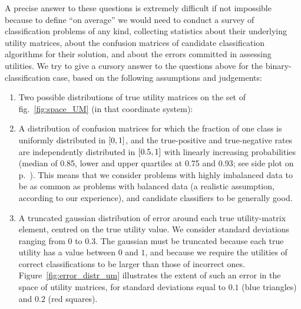 \documentclass[\ifafour a4paper,12pt,\else a5paper,10pt,\fi%
onecolumn,oneside,article,%
british%
]{memoir}
\theoremstyle{remark}
\theoremstyle{innote}
\DeclarePairedDelimiter\clcl{[}{]}
\renewcommand*{\|}[1][]{\nonscript\:#1\vert\nonscript\:\mathopen{}}
\newcommand*{\eqn}{eq.}%
\newcommand*{\fig}{fig.}%
\newcommand*{\sumatrix}[4]{\begin{bsmallmatrix*}[r]#1&#2\\#3&#4\end{bsmallmatrix*}}
\begin{document}
A precise answer to these questions is extremely difficult if not impossible because to define \enquote{on average} we would need to conduct a survey of classification problems of any kind, collecting statistics about their underlying utility matrices, about the confusion matrices of candidate classification algorithms for their solution, and about the errors committed in assessing utilities. We try to give a cursory answer to the questions above for the binary-classification case, based on the following assumptions and judgements:
\begin{enumerate}[label=(\roman*)]
\item\label{item:distr_um} Two possible distributions of true utility matrices on the set of \fig~\ref{fig:space_UM} (in that coordinate system):   

\item\label{item:distr_cm} A distribution of confusion matrices for which the fraction of one class is uniformly distributed in $\clcl{0,1}$, and the true-positive and true-negative rates are independently distributed in $\clcl{0.5, 1}$ with linearly increasing probabilities (median of 0.85, lower and upper quartiles at 0.75 and 0.93; see side plot on p.~\pageref{fig:linear_distr}). This means that we consider problems with highly imbalanced data to be as common as problems with balanced data (a realistic assumption, according to our experience), and candidate classifiers to be generally good.
  
\item\label{item:distr_error} A truncated gaussian distribution of error around each true utility-matrix element, centred on the true utility value. We consider standard deviations ranging from $0$ to $0.3$. The gaussian must be truncated because each true utility has a value between $0$ and $1$, and because we require the utilities of correct classifications to be larger than those of incorrect ones. Figure~\ref{fig:error_distr_um} illustrates the extent of such an error in the space of utility matrices, for standard deviations equal to $0.1$ (blue triangles) and $0.2$ (red squares).
\end{enumerate}
\end{document}
